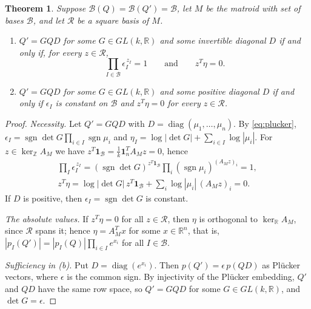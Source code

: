 \documentclass[11pt,a4paper]{article}
\theoremstyle{plain}
\newtheorem{theorem}{Theorem}[section]
\theoremstyle{definition}
\newcommand{\R}{\mathbb R}
\newcommand{\Z}{\mathbb Z}
\newcommand{\AM}{A_M}
\newcommand{\kerZ}{\ker_{\Z}\!A_M}
\newcommand{\kerR}{\ker_{\R}\!A_M}
\newcommand{\bs}{\mathcal B}
\newcommand{\sgn}{\operatorname{sgn}}
\newcommand{\ind}{\mathbf 1}
\begin{document}
\begin{theorem}\label{thm:criterion}
Suppose $\bs(Q)=\bs(Q')=\bs$, let $M$ be the matroid with set of bases $\bs$, and let $\mathcal R$ be a square basis of $M$.
\begin{enumerate}[label=(\alph*),itemsep=1pt]
\item $Q'=GQD$ for some $G\in GL(k,\R)$ and some invertible diagonal $D$ if and only if, for every $z\in\mathcal R$,
\[
\prod_{I\in\bs}\epsilon_I^{\,z_I}=1\qquad\text{and}\qquad z^{T}\eta=0.
\]
\item $Q'=GQD$ for some $G\in GL(k,\R)$ and some positive diagonal $D$ if and only if $\epsilon_I$ is constant on $\bs$ and $z^{T}\eta=0$ for every $z\in\mathcal R$.
\end{enumerate}
\end{theorem}
\begin{proof}
\emph{Necessity.} Let $Q'=GQD$ with $D=\operatorname{diag}(\mu_1,\dots,\mu_n)$. By \eqref{eq:plucker}, $\epsilon_I=\sgn\det G\prod_{i\in I}\sgn\mu_i$ and $\eta_I=\log|\det G|+\sum_{i\in I}\log|\mu_i|$. For $z\in\kerZ$ we have $z^{T}\ind_{\bs}=\tfrac1k\ind_n^{T}\AM z=0$, hence
\begin{gather*}
\prod_{I}\epsilon_I^{\,z_I}=(\sgn\det G)^{z^T\ind_{\bs}}\prod_i(\sgn\mu_i)^{(\AM z)_i}=1,\\
z^T\eta=\log|\det G|\, z^T\ind_{\bs}+\sum_i\log|\mu_i|\,(\AM z)_i=0.
\end{gather*}
If $D$ is positive, then $\epsilon_I=\sgn\det G$ is constant.

\emph{The absolute values.} If $z^T\eta=0$ for all $z\in\mathcal R$, then $\eta$ is orthogonal to $\kerR$, since $\mathcal R$ spans it; hence $\eta=\AM^{T}x$ for some $x\in\R^n$, that is, $|p_I(Q')|=|p_I(Q)|\prod_{i\in I}e^{x_i}$ for all $I\in\bs$.

\emph{Sufficiency in (b).} Put $D=\operatorname{diag}(e^{x_i})$. Then $p(Q')=\epsilon\,p(QD)$ as Pl\"ucker vectors, where $\epsilon$ is the common sign. By injectivity of the Pl\"ucker embedding, $Q'$ and $QD$ have the same row space, so $Q'=GQD$ for some $G\in GL(k,\R)$, and $\det G=\epsilon$.


\end{proof}
\end{document}
